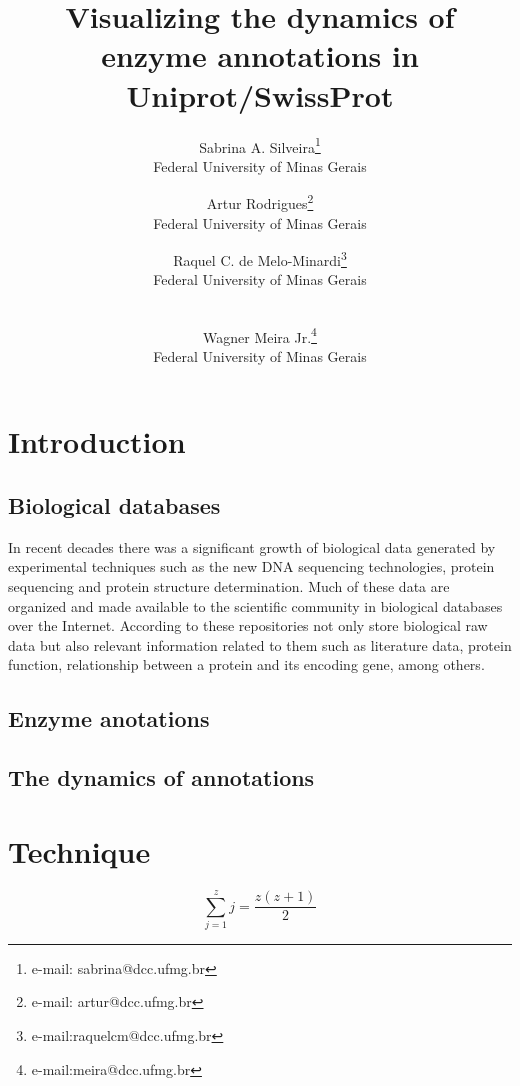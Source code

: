 \documentclass{vgtc}                          %
\title{Visualizing the dynamics of enzyme annotations in Uniprot/SwissProt}
\author{Sabrina A. Silveira\thanks{e-mail: sabrina@dcc.ufmg.br}\\ %
        \scriptsize Federal University of Minas Gerais %
\and Artur Rodrigues\thanks{e-mail: artur@dcc.ufmg.br} \\ %
        \scriptsize Federal University of Minas Gerais\\ %
\and Raquel C. de Melo-Minardi\thanks{e-mail:raquelcm@dcc.ufmg.br}\\ %
     \scriptsize Federal University of Minas Gerais
\and \\Wagner Meira Jr.\thanks{e-mail:meira@dcc.ufmg.br}\\ %
     \scriptsize Federal University of Minas Gerais
}
\begin{document}

\maketitle

\section{Introduction} 

\subsection{Biological databases}

In recent decades there was a significant growth of biological data generated by experimental techniques such as the new DNA sequencing technologies, protein sequencing and protein structure determination. Much of these data are organized and made available to the scientific community in biological databases over the Internet. According to \cite{lesk2005database} these repositories not only store biological raw data but also relevant information related to them such as literature data, protein function, relationship between a protein and its encoding gene, among others.

\cite{brenner1999errors}
\cite{devos2001intrinsic}
\cite{green2005genome}
\cite{jones2007estimating}
\cite{schnoes2009annotation}
\cite{hung2010detect}

\subsection{Enzyme anotations}

\subsection{The dynamics of annotations}

\section{Technique}


\begin{equation}
 \sum_{j=1}^{z} j = \frac{z(z+1)}{2}
\end{equation}
\end{document}
